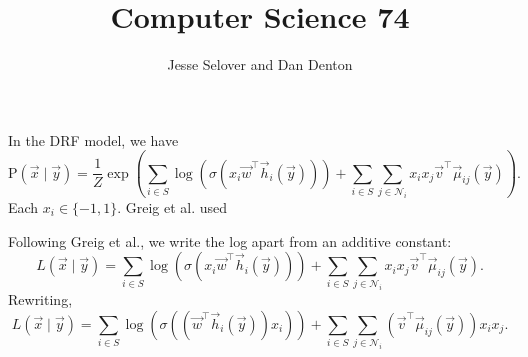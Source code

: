 \documentclass[12pt]{article}
\newcommand{\p}{\text{P}}
\theoremstyle{remark}
\begin{document}
\title{Computer Science 74}
\author{Jesse Selover and Dan Denton}
\maketitle


In the DRF model, we have
\[
\p(\vec{x}\mid\vec{y}) = \frac{1}{Z} \exp\left(\sum_{i\in S}
  \log(\sigma(x_i \vec{w}^{\top}\vec{h}_i(\vec{y}))) + \sum_{i \in S}
  \sum_{j \in \mathcal{N}_i}
  x_ix_j\vec{v}^{\top}\vec{\mu}_{ij}(\vec{y}) \right).
\]
Each $x_i \in \{-1,1\}$. Greig et al. used 

Following Greig et al., we write the log apart from an additive
constant:
\[
L(\vec{x} \mid \vec{y}) = \sum_{i \in S} \log(\sigma(x_i
\vec{w}^{\top}\vec{h}_i(\vec{y}))) + \sum_{i \in S}\sum_{j \in \mathcal{N}_i}
x_ix_j\vec{v}^{\top}\vec{\mu}_{ij}(\vec{y}).
\]
Rewriting,
\[
L(\vec{x} \mid \vec{y}) = \sum_{i \in S}
\log(\sigma((\vec{w}^{\top}\vec{h}_i(\vec{y})) x_i)) + \sum_{i \in S}\sum_{j \in \mathcal{N}_i}
(\vec{v}^{\top}\vec{\mu}_{ij}(\vec{y}))x_ix_j.
\]


\end{document}
